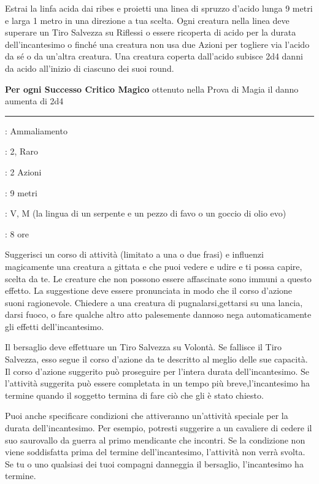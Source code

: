 \begin{multicols}{2}
Estrai la linfa acida dai ribes e proietti una linea di spruzzo d'acido lunga 9 metri e larga 1 metro in una direzione a tua scelta. Ogni creatura nella linea deve superare un Tiro Salvezza su Riflessi o essere ricoperta di acido per la durata dell'incantesimo o finché una creatura non usa due Azioni per togliere via l'acido da sé o da un'altra creatura. Una creatura coperta dall'acido subisce 2d4 danni da acido all'inizio di ciascuno dei suoi round.

\textbf{Per ogni Successo Critico Magico} ottenuto nella Prova di Magia il danno aumenta di 2d4

\smallskip\noindent\rule{\linewidth}{2pt} \hypertarget{Suggestione}{}\smallskip{}
\noindent
\begin{description}[noitemsep, topsep=0pt, parsep=0pt, partopsep=0pt, leftmargin=0cm, labelwidth=2.8cm]
	\item[\textbf{Lista di Magia}]: Ammaliamento
	\item[\textbf{Livello}]: 2, Raro
	\item[\textbf{T. di Lancio}]: 2 Azioni
	\item[\textbf{Gittata}]: 9 metri
	\item[\textbf{Componenti}]: V, M (la lingua di un serpente e un pezzo di favo o un goccio di olio evo)
	\item[\textbf{Durata}]: 8 ore
\end{description}

Suggerisci un corso di attività (limitato a una o due frasi) e influenzi magicamente una creatura a gittata e che puoi vedere e udire e ti possa capire, scelta da te. Le creature che non possono essere affascinate sono immuni a questo effetto. La suggestione deve essere pronunciata in modo che il corso d'azione suoni ragionevole. Chiedere a una creatura di pugnalarsi,gettarsi su una lancia, darsi fuoco, o fare qualche altro atto palesemente dannoso nega automaticamente gli effetti dell'incantesimo.

Il bersaglio deve effettuare un Tiro Salvezza su Volontà. Se fallisce il Tiro Salvezza, esso segue il corso d'azione da te descritto al meglio delle sue capacità. Il corso d'azione suggerito può proseguire per l'intera durata dell'incantesimo. Se l'attività suggerita può essere completata in un tempo più breve,l'incantesimo ha termine quando il soggetto termina di fare ciò che gli è stato chiesto.

Puoi anche specificare condizioni che attiveranno un'attività speciale per la durata dell'incantesimo. Per esempio, potresti suggerire a un cavaliere di cedere il suo saurovallo da guerra al primo mendicante che incontri. Se la condizione non viene soddisfatta prima del termine dell'incantesimo, l'attività non verrà svolta. Se tu o uno qualsiasi dei tuoi compagni danneggia il bersaglio, l'incantesimo ha termine.


\end{multicols}
